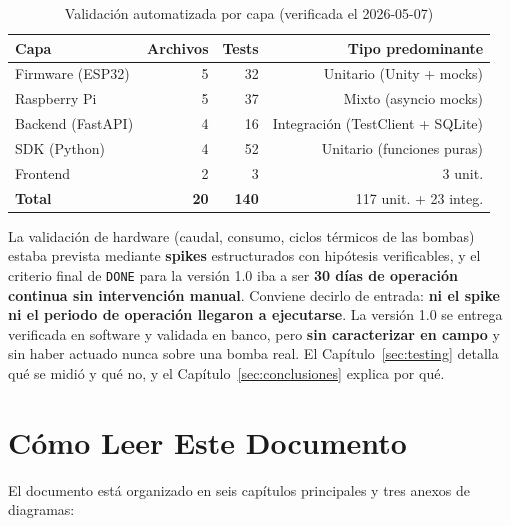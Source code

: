 \begin{table}[H]
    \centering
    \caption{Validación automatizada por capa (verificada el 2026-05-07)}
    \begin{tabular}{lrrr}
        \toprule
        \textbf{Capa}      & \textbf{Archivos} & \textbf{Tests} & \textbf{Tipo predominante} \\
        \midrule
        Firmware (ESP32)   & 5                 & 32             & Unitario (Unity + mocks) \\
        Raspberry Pi       & 5                 & 37             & Mixto (asyncio mocks) \\
        Backend (FastAPI)  & 4                 & 16             & Integración (TestClient + SQLite) \\
        SDK (Python)       & 4                 & 52             & Unitario (funciones puras) \\
        \midrule
        Frontend           & 2                 & 3              & 3 unit. \\
        \midrule
        \textbf{Total}     & \textbf{20}       & \textbf{140}   & 117 unit. + 23 integ. \\
        \bottomrule
    \end{tabular}
    \label{tab:exec_tests}
\end{table}

La validación de hardware (caudal, consumo, ciclos térmicos de las bombas) estaba
prevista mediante \textbf{spikes} estructurados con hipótesis verificables, y el
criterio final de \texttt{DONE} para la versión 1.0 iba a ser \textbf{30 días de
operación continua sin intervención manual}. Conviene decirlo de entrada: \textbf{ni
el spike ni el periodo de operación llegaron a ejecutarse}. La versión 1.0 se entrega
verificada en software y validada en banco, pero \textbf{sin caracterizar en campo}
y sin haber actuado nunca sobre una bomba real. El Capítulo~\ref{sec:testing} detalla
qué se midió y qué no, y el Capítulo~\ref{sec:conclusiones} explica por qué.

\section*{Cómo Leer Este Documento}

El documento está organizado en seis capítulos principales y tres anexos de diagramas:

